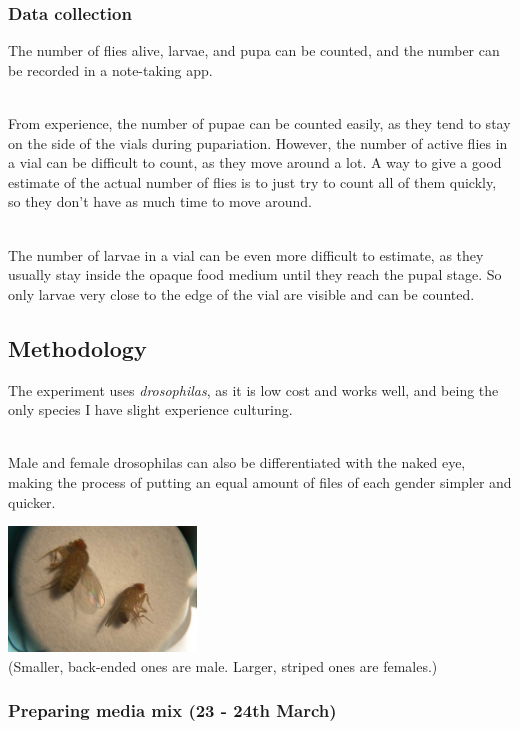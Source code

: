 \documentclass{article}
\begin{document}
\subsubsection{Data collection}

The number of flies alive, larvae, and pupa can be counted, and the number can be recorded in a note-taking app.

\noindent\\
From experience, the number of pupae can be counted easily, as they tend to stay on the side of the vials during pupariation. However, the number of active flies in a vial can be difficult to count, as they move around a lot. A way to give a good estimate of the actual number of flies is to just try to count all of them quickly, so they don't have as much time to move around.

\noindent\\
The number of larvae in a vial can be even more difficult to estimate, as they usually stay inside the opaque food medium until they reach the pupal stage\cite{in_medium}. So only larvae very close to the edge of the vial are visible and can be counted.

\subsection{Methodology}

The experiment uses \emph{drosophilas}, as it is low cost and works well, and being the only species I have slight experience culturing.

\noindent\\
Male and female drosophilas can also be differentiated with the naked eye, making the process of putting an equal amount of files of each gender simpler and quicker.\\

\begin{center}
\includegraphics[width=5cm]{fm-flies}
\noindent\\
(Smaller, back-ended ones are male. Larger, striped ones are females.)
\end{center}

\subsubsection{Preparing media mix (23 - 24th March)}
\end{document}
